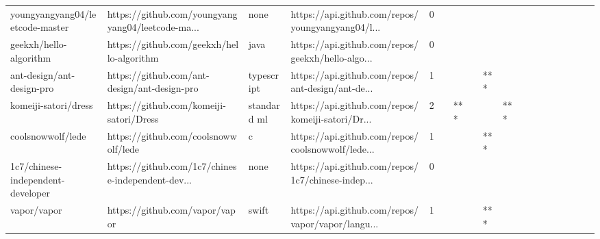 \begin{tabular}{llllrlllllllllllll}
youngyangyang04/leetcode-master                    &  https://github.com/youngyangyang04/leetcode-ma... &              none &  https://api.github.com/repos/youngyangyang04/l... &       0 &         &        &           &                &                 &        &           &           &          &          &       &              &          \\
geekxh/hello-algorithm                             &          https://github.com/geekxh/hello-algorithm &              java &  https://api.github.com/repos/geekxh/hello-algo... &       0 &         &        &           &                &                 &        &           &           &          &          &       &              &          \\
ant-design/ant-design-pro                          &       https://github.com/ant-design/ant-design-pro &        typescript &  https://api.github.com/repos/ant-design/ant-de... &       1 &         &        &           &            *** &                 &        &           &           &          &          &       &              &          \\
komeiji-satori/dress                               &            https://github.com/komeiji-satori/Dress &       standard ml &  https://api.github.com/repos/komeiji-satori/Dr... &       2 &         &    *** &           &                &             *** &        &           &           &          &          &       &              &          \\
coolsnowwolf/lede                                  &               https://github.com/coolsnowwolf/lede &                 c &  https://api.github.com/repos/coolsnowwolf/lede... &       1 &         &        &           &            *** &                 &        &           &           &          &          &       &              &          \\
1c7/chinese-independent-developer                  &  https://github.com/1c7/chinese-independent-dev... &              none &  https://api.github.com/repos/1c7/chinese-indep... &       0 &         &        &           &                &                 &        &           &           &          &          &       &              &          \\
vapor/vapor                                        &                     https://github.com/vapor/vapor &             swift &  https://api.github.com/repos/vapor/vapor/langu... &       1 &         &        &           &            *** &                 &        &           &           &          &          &       &              &          \\

\end{tabular}
